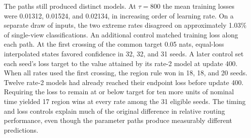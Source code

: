 The paths still produced distinct models. At \(\tau=800\) the mean training losses were 0.01312, 0.01524, and 0.02134, in increasing order of learning rate. On a separate draw of inputs, the two extreme rates disagreed on approximately 1.03\% of single-view classifications. An additional control matched training loss along each path. At the first crossing of the common target 0.05 nats, equal-loss interpolated states favored confidence in 32, 32, and 31 seeds. A later control set each seed's loss target to the value attained by its rate-2 model at update 400. When all rates used the first crossing, the region rule won in 18, 18, and 20 seeds. Twelve rate-2 models had already reached their endpoint loss before update 400. Requiring the loss to remain at or below target for ten more units of nominal time yielded 17 region wins at every rate among the 31 eligible seeds. The timing and loss controls explain much of the original difference in relative routing performance, even though the parameter paths produce measurably different predictions.
